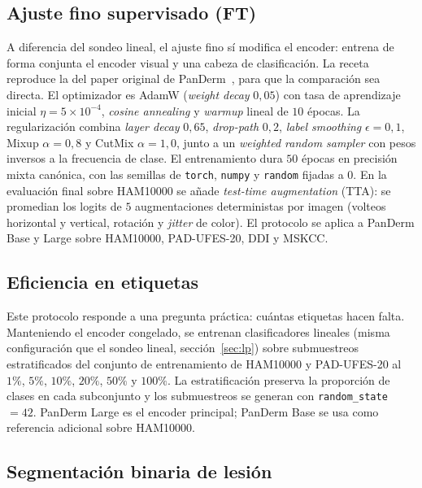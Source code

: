 \subsection{Ajuste fino supervisado (FT)}
\label{sec:ft}

A diferencia del sondeo lineal, el ajuste fino sí modifica el
encoder: entrena de forma conjunta el encoder visual y una cabeza de
clasificación. La receta reproduce la del paper original de
PanDerm~\cite{panderm2025}, para que la comparación sea directa.
El optimizador es AdamW (\emph{weight decay} $0{,}05$) con tasa de
aprendizaje inicial $\eta = 5\times 10^{-4}$, \emph{cosine
annealing} y \emph{warmup} lineal de $10$ épocas. La regularización
combina \emph{layer decay} $0{,}65$, \emph{drop-path} $0{,}2$,
\emph{label smoothing} $\epsilon = 0{,}1$, Mixup $\alpha = 0{,}8$
y CutMix $\alpha = 1{,}0$, junto a un \emph{weighted random
sampler} con pesos inversos a la frecuencia de clase. El
entrenamiento dura $50$ épocas en precisión mixta canónica, con
las semillas de \texttt{torch}, \texttt{numpy} y \texttt{random}
fijadas a $0$. En la evaluación final sobre HAM10000 se añade
\emph{test-time augmentation} (TTA): se promedian los logits de
$5$ augmentaciones deterministas por imagen (volteos horizontal y
vertical, rotación y \emph{jitter} de color). El protocolo se
aplica a PanDerm Base y Large sobre HAM10000, PAD-UFES-20, DDI y
MSKCC.

\subsection{Eficiencia en etiquetas}
\label{sec:label-eff}

Este protocolo responde a una pregunta práctica: cuántas etiquetas
hacen falta. Manteniendo el encoder congelado, se entrenan
clasificadores lineales (misma configuración que el sondeo lineal,
sección~\ref{sec:lp}) sobre submuestreos estratificados del
conjunto de entrenamiento de HAM10000 y PAD-UFES-20 al $1\%$,
$5\%$, $10\%$, $20\%$, $50\%$ y $100\%$. La
estratificación preserva la proporción de clases en cada subconjunto
y los submuestreos se generan con \texttt{random\_state}~$=42$.
PanDerm Large es el encoder principal; PanDerm Base se usa como
referencia adicional sobre HAM10000.

\subsection{Segmentación binaria de lesión}
\label{sec:segmentacion}

